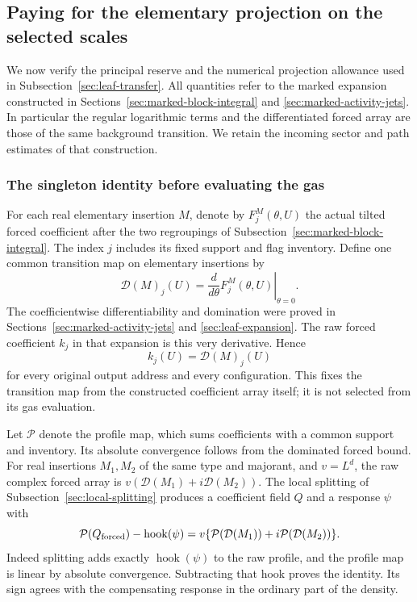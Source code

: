 \subsection{Paying for the elementary projection on the selected scales}
\label{sec:projection-payment-producer}
We now verify the principal reserve and the numerical projection
allowance used in Subsection~\ref{sec:leaf-transfer}. All quantities
refer to the marked expansion constructed in
Sections~\ref{sec:marked-block-integral} and
\ref{sec:marked-activity-jets}. In particular the regular logarithmic
terms and the differentiated forced array are those of the same
background transition. We retain the incoming sector and path
estimates of that construction.

\subsubsection{The singleton identity before evaluating the gas}
For each real elementary insertion $M$, denote by
$F^M_j(\theta,U)$ the actual tilted forced coefficient after the
two regroupings of Subsection~\ref{sec:marked-block-integral}.
The index $j$ includes its fixed support and flag inventory.
Define one common transition map on elementary insertions by
\[
             \mathcal D(M)_j(U)
                    =\left.\frac{d}{d\theta}
                                    F^M_j(\theta,U)\right|_{\theta=0}.
\]
The coefficientwise differentiability and domination were proved
in Sections~\ref{sec:marked-activity-jets} and
\ref{sec:leaf-expansion}. The raw forced coefficient $k_j$ in
that expansion is this very derivative. Hence
\begin{equation}\label{eq:projection-singleton-entrywise}
                         k_j(U)=\mathcal D(M)_j(U)
\end{equation}
for every original output address and every configuration.
This fixes the transition map from the constructed coefficient
array itself; it is not selected from its gas evaluation.

Let $\mathcal P$ denote the profile map, which sums coefficients
with a common support and inventory. Its absolute convergence
follows from the dominated forced bound. For real insertions
$M_1,M_2$ of the same type and majorant, and $v=L^d$, the raw
complex forced array is
$v(\mathcal D(M_1)+i\mathcal D(M_2))$. The local splitting of
Subsection~\ref{sec:local-splitting} produces a coefficient field
$Q$ and a response $\psi$ with
\begin{equation}\label{eq:projection-profile-retained}
 \mathcal P(Q_{\rm forced})-\operatorname{hook}(\psi)
       =v\{\mathcal P(\mathcal D(M_1))
                         +i\mathcal P(\mathcal D(M_2))\}.
\end{equation}
Indeed splitting adds exactly $\operatorname{hook}(\psi)$ to
the raw profile, and the profile map is linear by absolute
convergence. Subtracting that hook proves the identity. Its
sign agrees with the compensating response in the ordinary
part of the density.

